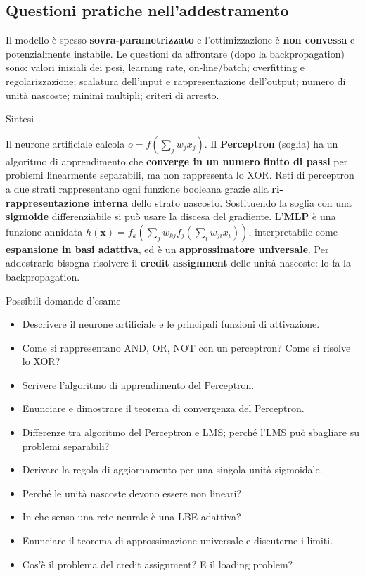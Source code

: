 \subsection{Questioni pratiche
nell'addestramento}\label{questioni-pratiche-nelladdestramento}

Il modello è spesso \textbf{sovra-parametrizzato} e l'ottimizzazione è
\textbf{non convessa} e potenzialmente instabile. Le questioni da
affrontare (dopo la backpropagation) sono: valori iniziali dei pesi,
learning rate, on-line/batch; overfitting e regolarizzazione; scalatura
dell'input e rappresentazione dell'output; numero di unità nascoste;
minimi multipli; criteri di arresto.

\begin{boxabstract}{Sintesi}

Il neurone artificiale calcola \(o = f(\sum_j w_j x_j)\). Il
\textbf{Perceptron} (soglia) ha un algoritmo di apprendimento che
\textbf{converge in un numero finito di passi} per problemi linearmente
separabili, ma non rappresenta lo XOR. Reti di perceptron a due strati
rappresentano ogni funzione booleana grazie alla
\textbf{ri-rappresentazione interna} dello strato nascosto. Sostituendo
la soglia con una \textbf{sigmoide} differenziabile si può usare la
discesa del gradiente. L'\textbf{MLP} è una funzione annidata
\(h(\mathbf{x}) = f_k(\sum_j w_{kj} f_j(\sum_i w_{ji} x_i))\),
interpretabile come \textbf{espansione in basi adattiva}, ed è un
\textbf{approssimatore universale}. Per addestrarlo bisogna risolvere il
\textbf{credit assignment} delle unità nascoste: lo fa la
backpropagation.

\end{boxabstract}

\begin{boxquestion}{Possibili domande d'esame}

\begin{itemize}
\tightlist
\item
  Descrivere il neurone artificiale e le principali funzioni di
  attivazione.
\item
  Come si rappresentano AND, OR, NOT con un perceptron? Come si risolve
  lo XOR?
\item
  Scrivere l'algoritmo di apprendimento del Perceptron.
\item
  Enunciare e dimostrare il teorema di convergenza del Perceptron.
\item
  Differenze tra algoritmo del Perceptron e LMS; perché l'LMS può
  sbagliare su problemi separabili?
\item
  Derivare la regola di aggiornamento per una singola unità sigmoidale.
\item
  Perché le unità nascoste devono essere non lineari?
\item
  In che senso una rete neurale è una LBE adattiva?
\item
  Enunciare il teorema di approssimazione universale e discuterne i
  limiti.
\item
  Cos'è il problema del credit assignment? E il loading problem?
\end{itemize}

\end{boxquestion}
